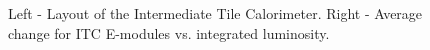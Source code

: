 \begin{figure}[htb]
\centering
{}
\quad
{}

\caption{Left - Layout of the Intermediate Tile Calorimeter. Right - Average change for ITC E-modules vs. integrated luminosity.}
\end{figure} 

